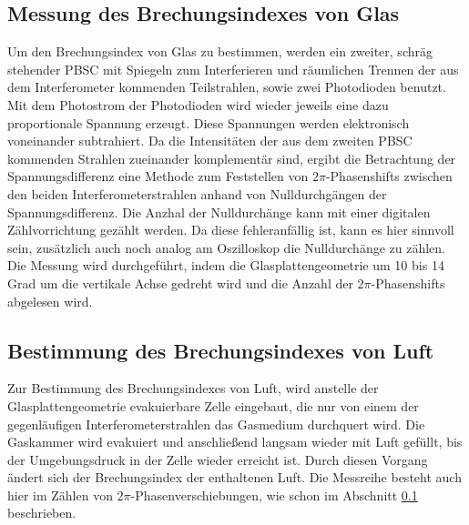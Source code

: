 \subsection{Messung des Brechungsindexes von Glas}
\label{subsec:glas}
Um den Brechungsindex von Glas zu bestimmen, werden ein zweiter, schräg stehender PBSC mit Spiegeln zum Interferieren und räumlichen Trennen der aus dem Interferometer kommenden Teilstrahlen, sowie zwei Photodioden benutzt. Mit dem Photostrom der Photodioden wird wieder jeweils eine dazu proportionale Spannung erzeugt. Diese Spannungen werden elektronisch voneinander subtrahiert. Da die Intensitäten der aus dem zweiten PBSC kommenden Strahlen zueinander komplementär sind, ergibt die Betrachtung der Spannungsdifferenz eine Methode zum Feststellen von $2\pi$-Phasenshifts zwischen den beiden Interferometerstrahlen anhand von Nulldurchgängen der Spannungsdifferenz. Die Anzhal der Nulldurchänge kann mit einer digitalen Zählvorrichtung gezählt werden. Da diese fehleranfällig ist, kann es hier sinnvoll sein, zusätzlich auch noch analog am Oszilloskop die Nulldurchänge zu zählen. Die Messung wird durchgeführt, indem die Glasplattengeometrie um 10 bis 14 Grad um die vertikale Achse gedreht wird und die Anzahl der $2\pi$-Phasenshifts abgelesen wird.


\subsection{Bestimmung des Brechungsindexes von Luft}
Zur Bestimmung des Brechungsindexes von Luft, wird anstelle der Glasplattengeometrie evakuierbare Zelle eingebaut, die nur von einem der gegenläufigen Interferometerstrahlen das Gasmedium durchquert wird. Die Gaskammer wird evakuiert und anschließend langsam wieder mit Luft gefüllt, bis der Umgebungsdruck in der Zelle wieder erreicht ist. Durch diesen Vorgang ändert sich der Brechungsindex der enthaltenen Luft. Die Messreihe besteht auch hier im Zählen von $2\pi$-Phasenverschiebungen, wie schon im Abschnitt \ref{subsec:glas} beschrieben.

